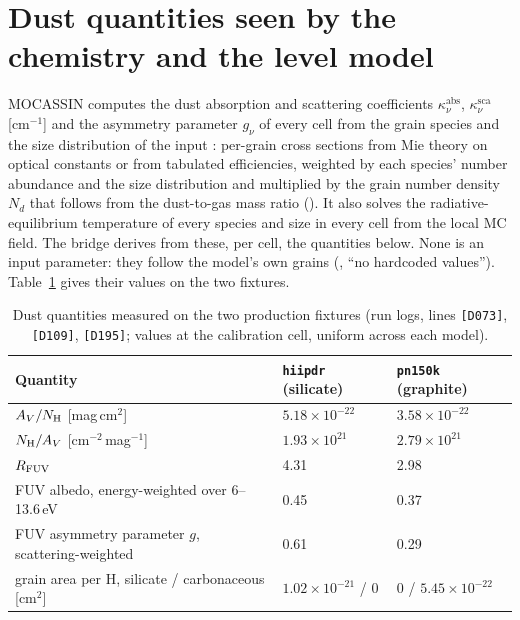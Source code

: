 \section{Dust quantities seen by the chemistry and the level model}
\label{sec:dust}

MOCASSIN computes the dust absorption and scattering coefficients
$\kappa^{\mathrm{abs}}_\nu$, $\kappa^{\mathrm{sca}}_\nu$ [cm$^{-1}$] and the
asymmetry parameter $g_\nu$ of every cell from the grain species and the size
distribution of the input \citep{Ercolano2005}: per-grain cross sections from
Mie theory on optical constants \citep{BohrenHuffman1983} or from tabulated
efficiencies, weighted by each species' number abundance and the size
distribution and multiplied by the grain number density $N_d$ that follows
from the dust-to-gas mass ratio (). It also solves the
radiative-equilibrium temperature of every species and size in every cell from
the local MC field. The bridge derives from these, per cell, the quantities
below. None is an input parameter: they follow the model's own grains
(, ``no hardcoded values''). Table~\ref{tab:dustfix} gives
their values on the two fixtures.

\begin{table}[H]
\centering
\caption{Dust quantities measured on the two production fixtures (run logs,
lines \texttt{[D073]}, \texttt{[D109]}, \texttt{[D195]}; values at the
calibration cell, uniform across each model).}\label{tab:dustfix}
\begin{tabular}{@{}lll@{}}
\toprule
Quantity & \texttt{hiipdr} (silicate) & \texttt{pn150k} (graphite) \\
\midrule
$A_{V}/N_{\mathrm H}$ [mag\,cm$^2$] & $5.18\times10^{-22}$ & $3.58\times10^{-22}$ \\
$N_{\mathrm H}/A_{V}$ [cm$^{-2}$\,mag$^{-1}$] & $1.93\times10^{21}$ & $2.79\times10^{21}$ \\
$R_{\mathrm{FUV}}$ & 4.31 & 2.98 \\
FUV albedo, energy-weighted over 6--13.6\,eV & 0.45 & 0.37 \\
FUV asymmetry parameter $g$, scattering-weighted & 0.61 & 0.29 \\
grain area per H, silicate / carbonaceous [cm$^2$] & $1.02\times10^{-21}$ / 0 & 0 / $5.45\times10^{-22}$ \\
\bottomrule
\end{tabular}
\end{table}

